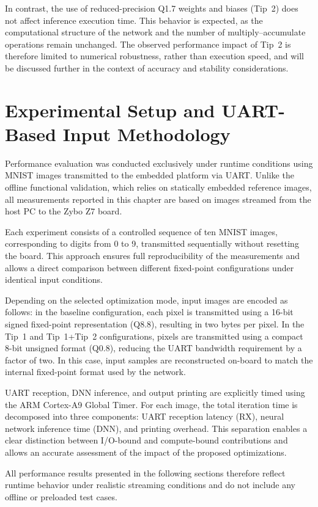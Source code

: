 In contrast, the use of reduced-precision Q1.7 weights and biases (Tip~2) does not
affect inference execution time.
This behavior is expected, as the computational structure of the network and the
number of multiply--accumulate operations remain unchanged.
The observed performance impact of Tip~2 is therefore limited to numerical
robustness, rather than execution speed, and will be discussed further in the
context of accuracy and stability considerations.


\section{Experimental Setup and UART-Based Input Methodology}

Performance evaluation was conducted exclusively under runtime conditions using
MNIST images transmitted to the embedded platform via UART.
Unlike the offline functional validation, which relies on statically embedded
reference images, all measurements reported in this chapter are based on
images streamed from the host PC to the Zybo Z7 board.

Each experiment consists of a controlled sequence of ten MNIST images,
corresponding to digits from 0 to 9, transmitted sequentially without resetting
the board.
This approach ensures full reproducibility of the measurements and allows
a direct comparison between different fixed-point configurations under
identical input conditions.

Depending on the selected optimization mode, input images are encoded as follows:
in the baseline configuration, each pixel is transmitted using a 16-bit signed
fixed-point representation (Q8.8), resulting in two bytes per pixel.
In the Tip~1 and Tip~1+Tip~2 configurations, pixels are transmitted using a compact
8-bit unsigned format (Q0.8), reducing the UART bandwidth requirement by a factor
of two.
In this case, input samples are reconstructed on-board to match the internal
fixed-point format used by the network.

UART reception, DNN inference, and output printing are explicitly timed using the
ARM Cortex-A9 Global Timer.
For each image, the total iteration time is decomposed into three components:
UART reception latency (RX), neural network inference time (DNN), and printing
overhead.
This separation enables a clear distinction between I/O-bound and compute-bound
contributions and allows an accurate assessment of the impact of the proposed
optimizations.

All performance results presented in the following sections therefore reflect
runtime behavior under realistic streaming conditions and do not include any
offline or preloaded test cases.


